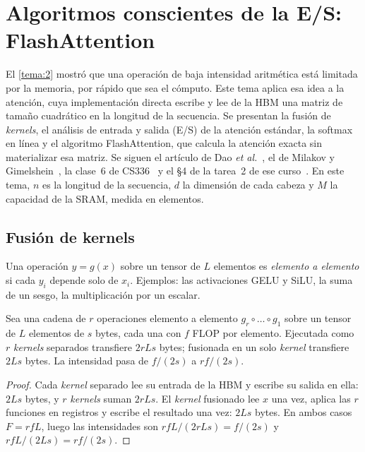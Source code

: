 \chapter{Algoritmos conscientes de la E/S: FlashAttention}
\label{tema:3}

El \cref{tema:2} mostró que una operación de baja intensidad aritmética está limitada por la memoria, por rápido que sea el cómputo. Este tema aplica esa idea a la atención, cuya implementación directa escribe y lee de la HBM una matriz de tamaño cuadrático en la longitud de la secuencia. Se presentan la fusión de \emph{kernels}, el análisis de entrada y salida (E/S) de la atención estándar, la softmax en línea y el algoritmo FlashAttention, que calcula la atención exacta sin materializar esa matriz. Se siguen el artículo de Dao \emph{et al.}~\cite[§2--3]{flash}, el de Milakov y Gimelshein~\cite{milakov}, la clase~6 de CS336~\cite{cs336} y el §4 de la tarea~2 de ese curso~\cite{cs336a2}. En este tema, $n$ es la longitud de la secuencia, $d$ la dimensión de cada cabeza y $M$ la capacidad de la SRAM, medida en elementos.

\section{Fusión de kernels}

\begin{definicion}
Una operación $y=g(x)$ sobre un tensor de $L$ elementos es \emph{elemento a elemento} si cada $y_i$ depende solo de $x_i$. Ejemplos: las activaciones GELU y SiLU, la suma de un sesgo, la multiplicación por un escalar.
\end{definicion}

\begin{proposicion}\label{prop:fusion}
Sea una cadena de $r$ operaciones elemento a elemento $g_r\circ\dots\circ g_1$ sobre un tensor de $L$ elementos de $s$ bytes, cada una con $f$ FLOP por elemento. Ejecutada como $r$ \emph{kernels} separados transfiere $2rLs$ bytes; fusionada en un solo \emph{kernel} transfiere $2Ls$ bytes. La intensidad pasa de $f/(2s)$ a $rf/(2s)$.
\end{proposicion}

\begin{proof}
Cada \emph{kernel} separado lee su entrada de la HBM y escribe su salida en ella: $2Ls$ bytes, y $r$ \emph{kernels} suman $2rLs$. El \emph{kernel} fusionado lee $x$ una vez, aplica las $r$ funciones en registros y escribe el resultado una vez: $2Ls$ bytes. En ambos casos $F=rfL$, luego las intensidades son $rfL/(2rLs)=f/(2s)$ y $rfL/(2Ls)=rf/(2s)$.
\end{proof}

